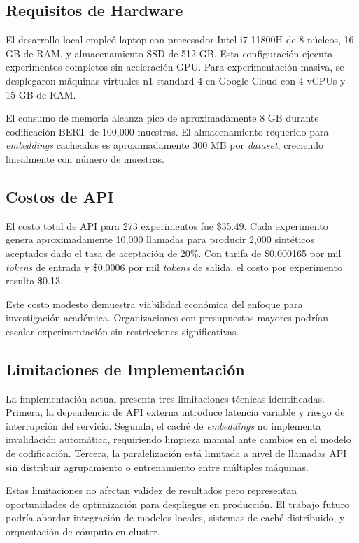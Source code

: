 \subsection{Requisitos de Hardware}
\label{subsec:hardware}

El desarrollo local empleó laptop con procesador Intel i7-11800H de 8 núcleos, 16 GB de RAM, y almacenamiento SSD de 512 GB. Esta configuración ejecuta experimentos completos sin aceleración GPU. Para experimentación masiva, se desplegaron máquinas virtuales n1-standard-4 en Google Cloud con 4 vCPUs y 15 GB de RAM.

El consumo de memoria alcanza pico de aproximadamente 8 GB durante codificación BERT de 100,000 muestras. El almacenamiento requerido para \textit{embeddings} cacheados es aproximadamente 300 MB por \textit{dataset}, creciendo linealmente con número de muestras.

\subsection{Costos de API}
\label{subsec:costos}

El costo total de API para 273 experimentos fue \$35.49. Cada experimento genera aproximadamente 10,000 llamadas para producir 2,000 sintéticos aceptados dado el tasa de aceptación de 20\%. Con tarifa de \$0.000165 por mil \textit{tokens} de entrada y \$0.0006 por mil \textit{tokens} de salida, el costo por experimento resulta \$0.13.

Este costo modesto demuestra viabilidad económica del enfoque para investigación académica. Organizaciones con presupuestos mayores podrían escalar experimentación sin restricciones significativas.

\subsection{Limitaciones de Implementación}
\label{subsec:limitaciones_impl}

La implementación actual presenta tres limitaciones técnicas identificadas. Primera, la dependencia de API externa introduce latencia variable y riesgo de interrupción del servicio. Segunda, el caché de \textit{embeddings} no implementa invalidación automática, requiriendo limpieza manual ante cambios en el modelo de codificación. Tercera, la paralelización está limitada a nivel de llamadas API sin distribuir agrupamiento o entrenamiento entre múltiples máquinas.

Estas limitaciones no afectan validez de resultados pero representan oportunidades de optimización para despliegue en producción. El trabajo futuro podría abordar integración de modelos locales, sistemas de caché distribuido, y orquestación de cómputo en cluster.